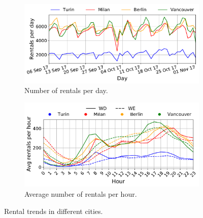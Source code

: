 \begin{figure}[t]
    \begin{center}
        \begin{subfigure}{0.49\textwidth}
            \includegraphics[width=\columnwidth]{figures/bookings_per_day.pdf}
            \caption{Number of rentals per day.}
            \label{fig:rentals_per_day}
        \end{subfigure}
         \begin{subfigure}{0.49\textwidth}
             \includegraphics[width=\columnwidth]{figures/aggBookginfsPerHour.pdf}
             \caption{Average number of rentals per hour.}
             \label{fig:rentals_per_hour}
         \end{subfigure}
         \caption{Rental trends in different cities.}
         \label{fig:rentals_trends}
\end{center}
\end{figure}


